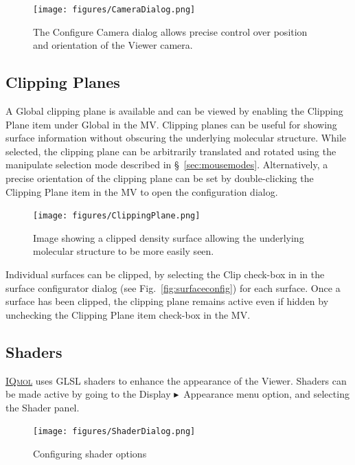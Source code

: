 \documentclass[a4paper,12pt]{article}
\newcommand{\iqmol}{\href{http://iqmol.org}{{\scshape IQmol}}}
\newcommand{\bt}{\ensuremath{\blacktriangleright}}
\begin{document}
\begin{figure}[h]
\begin{center}
\texttt{[image: figures/CameraDialog.png]}
\caption{The Configure Camera dialog allows precise control over position and orientation
of the Viewer camera.}
\end{center}
\end{figure}



\subsection{Clipping Planes}

A Global clipping plane is available and can be viewed by enabling the Clipping
Plane item under Global in the MV.  Clipping planes can be useful for showing
surface information without obscuring the underlying molecular structure.
While selected, the clipping plane can be arbitrarily translated and rotated
using the manipulate selection mode described in \S\ \ref{sec:mousemodes}.
Alternatively, a precise orientation of the clipping plane can be set by
double-clicking the Clipping Plane item in the MV to open the configuration
dialog.

\begin{figure}[h]
\begin{center}
\texttt{[image: figures/ClippingPlane.png]}
\caption{Image showing a clipped density surface allowing the underlying
molecular structure to be more easily seen.} 
\end{center}
\end{figure}

Individual surfaces can be clipped, by selecting the Clip check-box in in the
surface configurator dialog (see Fig.~\ref{fig:surfaceconfig}) for each
surface.  Once a surface has been clipped, the clipping plane remains active
even if hidden by unchecking the Clipping Plane item check-box in the MV.


\subsection{Shaders}

\iqmol{} uses GLSL shaders to enhance the appearance of the Viewer.  Shaders can
be made active by going to the Display \bt\ Appearance menu option, and selecting
the Shader panel.
\begin{figure}[h]
\begin{center}
\texttt{[image: figures/ShaderDialog.png]}
\caption{Configuring shader options}
\end{center}
\end{figure}
\end{document}
